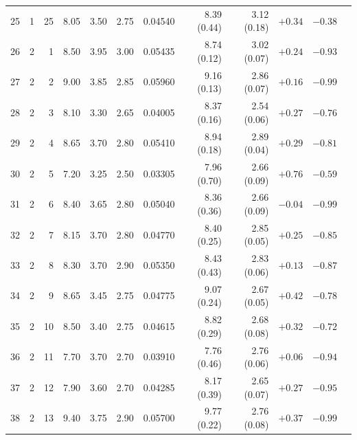 \begin{longtable}{@{}rrrrrrrrrrrr@{}}
25 & 1 & 25 & \num{8.05} & \num{3.50} & \num{2.75} & \num{0.04540} & \num{8.39} (\num{0.44}) & \num{3.12} (\num{0.18}) & $+\num{0.34}$ & $-\num{0.38}$ &  \\
26 & 2 & 1 & \num{8.50} & \num{3.95} & \num{3.00} & \num{0.05435} & \num{8.74} (\num{0.12}) & \num{3.02} (\num{0.07}) & $+\num{0.24}$ & $-\num{0.93}$ &  \\
27 & 2 & 2 & \num{9.00} & \num{3.85} & \num{2.85} & \num{0.05960} & \num{9.16} (\num{0.13}) & \num{2.86} (\num{0.07}) & $+\num{0.16}$ & $-\num{0.99}$ &  \\
28 & 2 & 3 & \num{8.10} & \num{3.30} & \num{2.65} & \num{0.04005} & \num{8.37} (\num{0.16}) & \num{2.54} (\num{0.06}) & $+\num{0.27}$ & $-\num{0.76}$ &  \\
29 & 2 & 4 & \num{8.65} & \num{3.70} & \num{2.80} & \num{0.05410} & \num{8.94} (\num{0.18}) & \num{2.89} (\num{0.04}) & $+\num{0.29}$ & $-\num{0.81}$ &  \\
30 & 2 & 5 & \num{7.20} & \num{3.25} & \num{2.50} & \num{0.03305} & \num{7.96} (\num{0.70}) & \num{2.66} (\num{0.09}) & $+\num{0.76}$ & $-\num{0.59}$ &  \\
31 & 2 & 6 & \num{8.40} & \num{3.65} & \num{2.80} & \num{0.05040} & \num{8.36} (\num{0.36}) & \num{2.66} (\num{0.09}) & $-\num{0.04}$ & $-\num{0.99}$ &  \\
32 & 2 & 7 & \num{8.15} & \num{3.70} & \num{2.80} & \num{0.04770} & \num{8.40} (\num{0.25}) & \num{2.85} (\num{0.05}) & $+\num{0.25}$ & $-\num{0.85}$ &  \\
33 & 2 & 8 & \num{8.30} & \num{3.70} & \num{2.90} & \num{0.05350} & \num{8.43} (\num{0.43}) & \num{2.83} (\num{0.06}) & $+\num{0.13}$ & $-\num{0.87}$ &  \\
34 & 2 & 9 & \num{8.65} & \num{3.45} & \num{2.75} & \num{0.04775} & \num{9.07} (\num{0.24}) & \num{2.67} (\num{0.05}) & $+\num{0.42}$ & $-\num{0.78}$ &  \\
35 & 2 & 10 & \num{8.50} & \num{3.40} & \num{2.75} & \num{0.04615} & \num{8.82} (\num{0.29}) & \num{2.68} (\num{0.08}) & $+\num{0.32}$ & $-\num{0.72}$ &  \\
36 & 2 & 11 & \num{7.70} & \num{3.70} & \num{2.70} & \num{0.03910} & \num{7.76} (\num{0.46}) & \num{2.76} (\num{0.06}) & $+\num{0.06}$ & $-\num{0.94}$ &  \\
37 & 2 & 12 & \num{7.90} & \num{3.60} & \num{2.70} & \num{0.04285} & \num{8.17} (\num{0.39}) & \num{2.65} (\num{0.07}) & $+\num{0.27}$ & $-\num{0.95}$ &  \\
38 & 2 & 13 & \num{9.40} & \num{3.75} & \num{2.90} & \num{0.05700} & \num{9.77} (\num{0.22}) & \num{2.76} (\num{0.08}) & $+\num{0.37}$ & $-\num{0.99}$ &  \\

\end{longtable}
